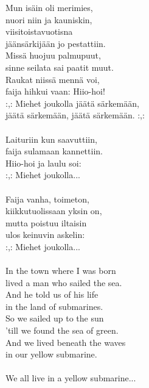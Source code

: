 
        Mun isäin oli merimies, \\
        nuori niin ja kauniskin, \\
        viisitoistavuotisna \\
        jäänsärkijään jo pestattiin. \\
        Missä huojuu palmupuut, \\
        sinne seilata sai paatit muut. \\
        Raukat niissä mennä voi, \\
        faija hihkui vaan: Hiio-hoi! \\
        :,: Miehet joukolla jäätä särkemään, \\
        jäätä särkemään, jäätä särkemään. :,: \\
\hspace{10mm} \\
        Laituriin kun saavuttiin, \\
        faija sulamaan kannettiin. \\
        Hiio-hoi ja laulu soi: \\
        :,: Miehet joukolla... \\
\hspace{10mm} \\
        Faija vanha, toimeton, \\
        kiikkutuolissaan yksin on, \\
        mutta poistuu iltaisin \\
        ulos keinuvin askelin: \\
        :,: Miehet joukolla... \\
\hspace{10mm} \\
        In the town where I was born \\
        lived a man who sailed the sea. \\
        And he told us of his life \\
        in the land of submarines. \\
        So we sailed up to the sun \\
        'till we found the sea of green. \\
        And we lived beneath the waves \\
        in our yellow submarine. \\
\hspace{10mm} \\
        We all live in a yellow submarine... \\
